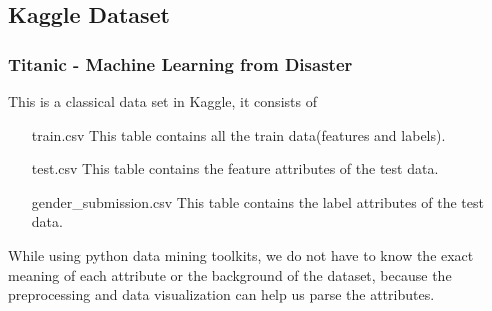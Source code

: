 \documentclass{beamer}
\begin{document}
\subsection{Kaggle Dataset}
\begin{frame}
	\frametitle{Titanic - Machine Learning from Disaster}


	\begin{flushleft}
		This is a classical data set in Kaggle, it consists of
		\begin{center}
			\begin{minipage}{0.8\textwidth}
				\begin{itemize}
					\item[train.csv] This table contains all the train data(features and labels).
					\item[test.csv] This table contains the feature attributes of the test data.
					\item[{\tiny gender\_submission.csv}] This table contains the label attributes of the test data.
				\end{itemize}
			\end{minipage}
		\end{center}
		While using python data mining toolkits, we do not have to know the exact meaning of each attribute or the background of the dataset, because the preprocessing and data visualization can help us parse the attributes.
	\end{flushleft}
\end{frame}

\end{document}
